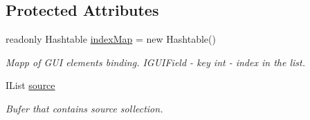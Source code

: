 \subsection*{Protected Attributes}
\begin{DoxyCompactItemize}
\item 
readonly Hashtable \mbox{\hyperlink{class_wpf_handler_1_1_u_i_1_1_controls_1_1_collection_control_af3a8d4c03474bbb80d8d461f4a8e33e8}{index\+Map}} = new Hashtable()
\begin{DoxyCompactList}\small\item\em Mapp of G\+UI elements binding. I\+G\+U\+I\+Field -\/ key int -\/ index in the list. \end{DoxyCompactList}\item 
I\+List \mbox{\hyperlink{class_wpf_handler_1_1_u_i_1_1_controls_1_1_collection_control_a78ccfdc5208ab2306308d7356757f32f}{source}}
\begin{DoxyCompactList}\small\item\em Bufer that contains source sollection. \end{DoxyCompactList}\end{DoxyCompactItemize}
